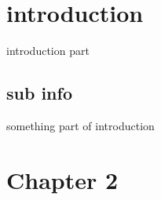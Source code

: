 \documentclass{article}
\begin{document}
 \section{introduction}
introduction part
\subsection{sub info}
something part of introduction
 \section{Chapter 2}
\end{document}
